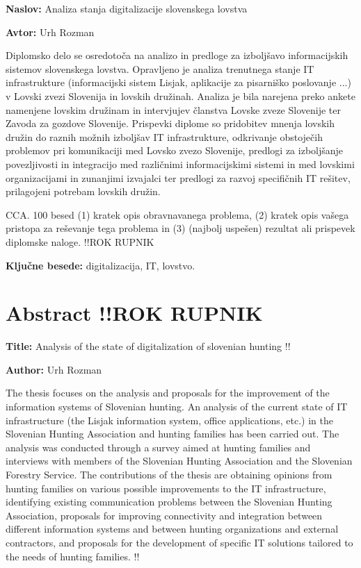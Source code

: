 \documentclass[a4paper,12pt,openright]{book}
\newcommand{\ttitle}{Analiza stanja digitalizacije slovenskega lovstva}
\newcommand{\ttitleEn}{Analysis of the state of digitalization of slovenian hunting !!}
\newcommand{\tauthor}{Urh Rozman}
\newcommand{\tkeywords}{digitalizacija, IT, lovstvo}
\newcommand{\clearemptydoublepage}{\newpage{\pagestyle{empty}\cleardoublepage}}
\begin{document}
\noindent\textbf{Naslov:} \ttitle
\bigskip

\noindent\textbf{Avtor:} \tauthor
\bigskip

\noindent 

Diplomsko delo se osredotoča na analizo in predloge za izboljšavo informacijskih sistemov slovenskega lovstva.
Opravljeno je analiza trenutnega stanje IT infrastrukture (informacijski sistem Lisjak, aplikacije za pisarniško poslovanje ...) v Lovski zvezi Slovenija in lovskih družinah.
Analiza je bila narejena preko ankete namenjene lovskim družinam in intervjujev članstva Lovske zveze Slovenije ter Zavoda za gozdove Slovenije.
Prispevki diplome so pridobitev mnenja lovskih družin do raznih možnih izboljšav IT infrastrukture, odkrivanje obstoječih problemov pri komunikaciji med Lovsko zvezo Slovenije, predlogi za izboljšanje povezljivosti in integracijo med različnimi informacijskimi sistemi in med lovskimi organizacijami in zunanjimi izvajalci ter predlogi za razvoj specifičnih IT rešitev, prilagojeni potrebam lovskih družin.  

CCA. 100 besed
 (1) kratek opis obravnavanega problema, (2) kratek opis vašega pristopa za reševanje tega problema in (3) (najbolj uspešen) rezultat ali prispevek diplomske naloge. !!ROK RUPNIK

\bigskip

\noindent\textbf{Ključne besede:} \tkeywords.
\clearemptydoublepage

\chapter*{Abstract !!ROK RUPNIK}

\noindent\textbf{Title:} \ttitleEn
\bigskip

\noindent\textbf{Author:} \tauthor
\bigskip

\noindent
The thesis focuses on the analysis and proposals for the improvement of the information systems of Slovenian hunting. An analysis of the current state of IT infrastructure (the Lisjak information system, office applications, etc.) in the Slovenian Hunting Association and hunting families has been carried out. The analysis was conducted through a survey aimed at hunting families and interviews with members of the Slovenian Hunting Association and the Slovenian Forestry Service. The contributions of the thesis are obtaining opinions from hunting families on various possible improvements to the IT infrastructure, identifying existing communication problems between the Slovenian Hunting Association, proposals for improving connectivity and integration between different information systems and between hunting organizations and external contractors, and proposals for the development of specific IT solutions tailored to the needs of hunting families.  !!
\bigskip
\end{document}
